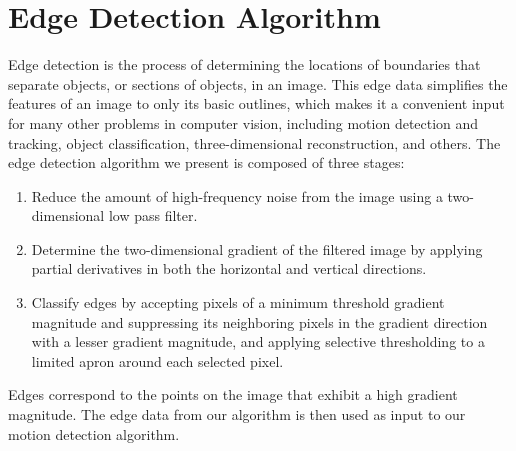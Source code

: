 \documentclass[journal]{IEEEtran}
\begin{document}
\section{Edge Detection Algorithm}
\label{edge-detection-section}
Edge detection is the process of determining the locations of boundaries that separate objects, or sections of objects, in an image. This edge data simplifies the features of an image to only its basic outlines, which makes it a convenient input for many other problems in computer vision, including motion detection and tracking, object classification, three-dimensional reconstruction, and others. The edge detection algorithm we present is composed of three stages:
\begin{enumerate}
	\item Reduce the amount of high-frequency noise from the image using a two-dimensional low pass filter.
	\item Determine the two-dimensional gradient of the filtered image by applying partial derivatives in both the horizontal and vertical directions.
	\item Classify edges by accepting pixels of a minimum threshold gradient magnitude and suppressing its neighboring pixels in the gradient direction with a lesser gradient magnitude, and applying selective thresholding to a limited apron around each selected pixel.
\end{enumerate}
Edges correspond to the points on the image that exhibit a high gradient magnitude. The edge data from our algorithm is then used as input to our motion detection algorithm.
\end{document}
